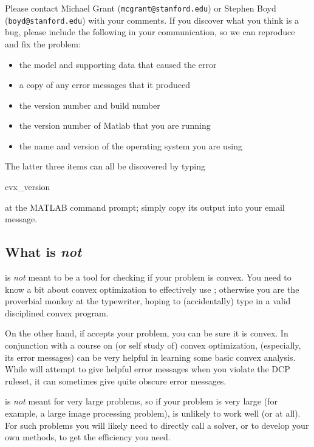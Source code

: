 \documentclass[12pt]{article}
\begin{document}
Please contact Michael Grant (\texttt{mcgrant@stanford.edu}) 
or Stephen Boyd (\texttt{boyd@stanford.edu}) with 
your comments. If you discover what you think is a bug, 
please include the following in your communication,
so we can reproduce and fix the problem:
\begin{itemize}
\item the \cvx model and supporting data that caused the error
\item a copy of any error messages that it produced
\item the \cvx version number and build number
\item the version number of Matlab that you are running
\item the name and version of the operating system you are using
\end{itemize}
The latter three items can all be discovered by typing
\begin{code}
	cvx_version
\end{code}
at the MATLAB command prompt; simply copy its output
into your email message.

\subsection{What \cvx is \emph{not}}

\cvx is \emph{not} meant to be a tool for checking if your problem
is convex.  
You need to know a bit about 
convex optimization to effectively use \cvx; otherwise you are the proverbial
monkey at the typewriter, hoping to (accidentally) type in a valid disciplined
convex program.

On the other hand, if \cvx accepts your problem, you can be sure
it is convex.
In conjunction with a course on (or self study of) convex optimization,
\cvx (especially, its error messages) can be very helpful in learning
some basic convex analysis.
While \cvx will attempt to give helpful error messages when
you violate the DCP ruleset, it can sometimes give quite obscure error
messages.  

\cvx is \emph{not} meant
for very large problems, so if your problem is very large
(for example, a large image processing problem), \cvx is unlikely to
work well (or at all).
For such problems you will likely need to directly call a solver,
or to develop your own methods, to get the efficiency you need.
\end{document}
